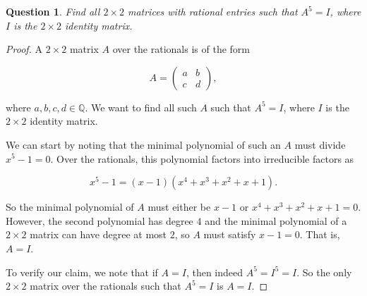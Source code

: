 \documentclass{amsart}
\theoremstyle{plain}
\newtheorem{question}{Question}
\begin{document}
\begin{question}
    Find all $2 \times 2$ matrices with rational entries such that $A^5 = I$, where $I$ is the $2 \times 2$ identity matrix.
\end{question}

\begin{proof}
    A $2 \times 2$ matrix $A$ over the rationals is of the form

\[
A = \begin{pmatrix}
a & b \\
c & d 
\end{pmatrix},
\]

where $a, b, c, d \in \mathbb{Q}$. We want to find all such $A$ such that $A^5 = I$, where $I$ is the $2 \times 2$ identity matrix. 

We can start by noting that the minimal polynomial of such an $A$ must divide $x^5 - 1 = 0$. Over the rationals, this polynomial factors into irreducible factors as

\[
x^5 - 1 = (x - 1)(x^4 + x^3 + x^2 + x + 1).
\]

So the minimal polynomial of $A$ must either be $x - 1$ or $x^4 + x^3 + x^2 + x + 1 = 0$. However, the second polynomial has degree $4$ and the minimal polynomial of a $2 \times 2$ matrix can have degree at most $2$, so $A$ must satisfy $x - 1 = 0$. That is, $A = I$. 

To verify our claim, we note that if $A = I$, then indeed $A^5 = I^5 = I$. So the only $2 \times 2$ matrix over the rationals such that $A^5 = I$ is $A = I$.
\end{proof}
\end{document}
